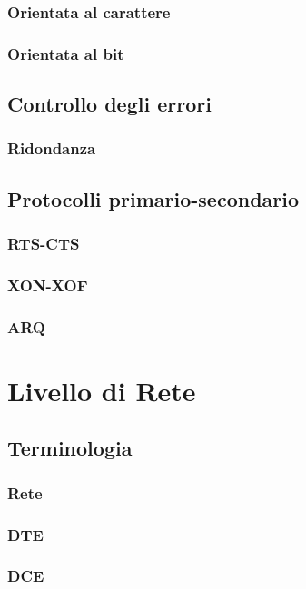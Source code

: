 \documentclass[a4paper,11pt]{paper}
\begin{document}
\subsubsection{Orientata al carattere}
\subsubsection{Orientata al bit}

\subsection{Controllo degli errori}
\subsubsection{Ridondanza}

\subsection{Protocolli primario-secondario}
\subsubsection{RTS-CTS}
\subsubsection{XON-XOF}
\subsubsection{ARQ}


\newpage
\section{Livello di Rete}

\subsection{Terminologia}
\subsubsection{Rete}
\subsubsection{DTE}
\subsubsection{DCE}
\end{document}
